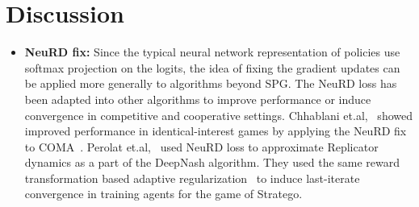 \chapter{Discussion}

\begin{itemize}

    \item{
        \textbf{NeuRD fix:} Since the typical neural network representation of policies use softmax projection on the logits,
        the idea of fixing the gradient updates can be applied more generally to algorithms beyond SPG.
        The NeuRD loss has been adapted into other algorithms to improve performance or induce convergence
        in competitive and cooperative settings.
        Chhablani et.al,~\cite{chhablaniCounterfactual2021} showed improved performance in
        identical-interest games by applying the NeuRD fix to COMA~\cite{foersterCounterfactual2018}.
        Perolat et.al,~\cite{perolatMastering2022} used NeuRD loss to approximate Replicator dynamics 
        as a part of the DeepNash algorithm. 
        They used the same reward transformation based adaptive regularization~\cite{perolatPoincare2021} to induce last-iterate convergence in training agents for the game of Stratego.
        
    }

\end{itemize}